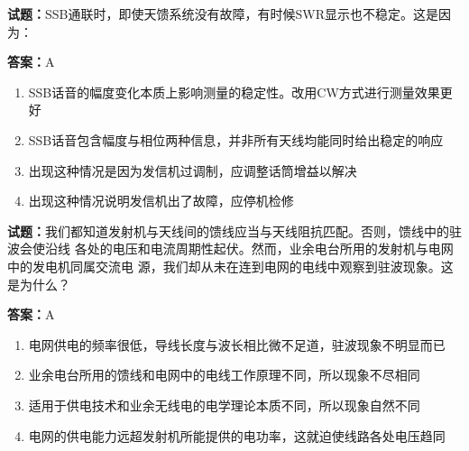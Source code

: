 \documentclass{ctexbook}
\begin{document}




\vspace{1em}

\textbf{试题：}SSB通联时，即使天馈系统没有故障，有时候SWR显示也不稳定。这是因为： 

\textbf{答案：}A 

\begin{enumerate}[leftmargin=3em]
  \item SSB话音的幅度变化本质上影响测量的稳定性。改用CW方式进行测量效果更好 

  \item SSB话音包含幅度与相位两种信息，并非所有天线均能同时给出稳定的响应 

  \item 出现这种情况是因为发信机过调制，应调整话筒增益以解决 

  \item 出现这种情况说明发信机出了故障，应停机检修 

\end{enumerate}





\vspace{1em}

\textbf{试题：}我们都知道发射机与天线间的馈线应当与天线阻抗匹配。否则，馈线中的驻波会使沿线
各处的电压和电流周期性起伏。然而，业余电台所用的发射机与电网中的发电机同属交流电
源，我们却从未在连到电网的电线中观察到驻波现象。这是为什么？ 

\textbf{答案：}A 

\begin{enumerate}[leftmargin=3em]
  \item 电网供电的频率很低，导线长度与波长相比微不足道，驻波现象不明显而已 

  \item 业余电台所用的馈线和电网中的电线工作原理不同，所以现象不尽相同 

  \item 适用于供电技术和业余无线电的电学理论本质不同，所以现象自然不同 

  \item 电网的供电能力远超发射机所能提供的电功率，这就迫使线路各处电压趋同 

\end{enumerate}

\end{document}
